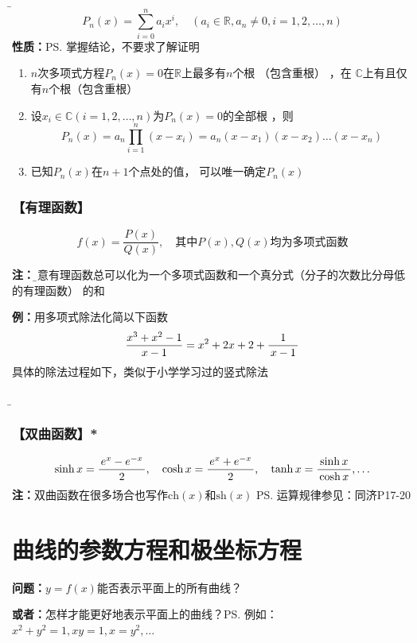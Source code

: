   {\b $$P_n(x)=\sum_{i=0}^na_ix^i,
  \quad (a_i\in\mathbb{R},a_n\ne 0,i=1,2,\ldots,n)$$
  {\bf 性质：}\ps{掌握结论，不要求了解证明}
  \begin{enumerate}[(1)]
    \setlength{\itemindent}{1cm}
    \item { $n$次多项式方程$P_n(x)=0$在$\mathbb{R}$上最多有$n$个根 （包含重根） ，在
    $\mathbb{C}$上有且仅有$n$个根（包含重根）}
    \item { 设$x_i\in\mathbb{C}(i=1,2,\ldots,n)$为$P_n(x)=0$的全部根 ，则
    $$P_n(x)=a_n\prod_{i=1}^n(x-x_i)=a_n(x-x_1)(x-x_2)\ldots(x-x_n)$$}
    \item { 已知$P_n(x)$在$n+1$个点处的值， 可以唯一确定$P_n(x)$}
  \end{enumerate}
  }

\subsubsection{【有理函数】}

$$f(x)=\frac{P(x)}{Q(x)}, \quad\mbox{其中}P(x),Q(x)\mbox{均为多项式函数}$$
  
{\bf 注：}{\b 任意有理函数总可以化为一个多项式函数和一个真分式（分子的次数比分母低的有理函数）
的和}
	  
{{\bf 例：}用多项式除法化简以下函数}
$$\frac{x^3+x^2-1}{x-1}=x^2+2x+2+\displaystyle\frac{\,{1}\,}{\,{x-1}\,}$$
具体的除法过程如下，类似于小学学习过的竖式除法
\begin{center}
	{\b {}}
\end{center}

\subsubsection{【双曲函数】*}

{\small $$\sinh x =\displaystyle\frac{\,{e^x-e^{-x}}\,}{\,{2}\,}, \quad
\cosh x =\displaystyle\frac{\,{e^x+e^{-x}}\,}{\,{2}\,}, \quad\tanh x=\displaystyle\frac{\,{\sinh
x}\,}{\,{\cosh x}\,}, \ldots$$}
{\bf 注：}双曲函数在很多场合也写作$\mathrm{ch}(x)$和$\mathrm{sh}(x)$
\ps{运算规律参见：同济P17-20}

\section{曲线的参数方程和极坐标方程}

{\bf 问题：}$y=f(x)$能否表示平面上的所有曲线？
	
{\bf 或者：}怎样才能更好地表示平面上的曲线？\ps{例如：$x^2+y^2=1,xy=1,x=y^2,\ldots$}

